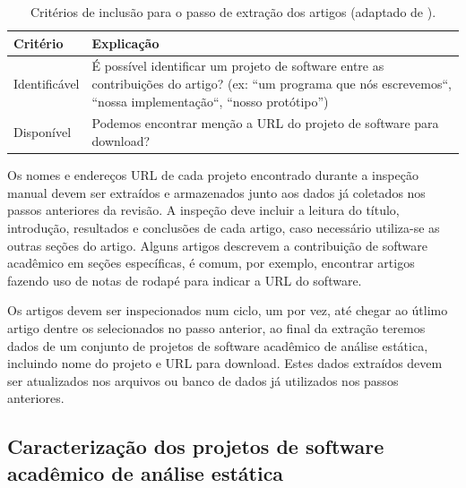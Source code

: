\begin{table}[h]
\caption{Critérios de inclusão para o passo de extração dos artigos (adaptado de ).}
\centering
\begin{tabular}{ l p{12cm} }
  \hline
  Critério         & Explicação \\
  \hline
  Identificável    & É possível identificar um projeto de software entre as contribuições do artigo? (ex: ``um programa que nós escrevemos``, ``nossa implementação``, ``nosso protótipo'') \\
  Disponível       & Podemos encontrar menção a URL do projeto de software para download? \\
  \hline
\end{tabular}
\label{criterios-extracao}
\end{table}

Os nomes e endereços URL de cada projeto encontrado durante a inspeção manual
devem ser extraídos e armazenados junto aos dados já coletados nos passos
anteriores da revisão. A inspeção deve incluir a leitura do título, introdução,
resultados e conclusões de cada artigo, caso necessário utiliza-se as outras
seções do artigo. Alguns artigos descrevem a contribuição de software acadêmico
em seções específicas, é comum, por exemplo, encontrar artigos fazendo uso de
notas de rodapé para indicar a URL do software.

Os artigos devem ser inspecionados num ciclo, um por vez, até chegar ao útlimo
artigo dentre os selecionados no passo anterior, ao final da extração teremos
dados de um conjunto de projetos de software acadêmico de análise estática,
incluindo nome do projeto e URL para download. Estes dados extraídos devem ser
atualizados nos arquivos ou banco de dados já utilizados nos passos anteriores.



\subsection{Caracterização dos projetos de software acadêmico de análise estática}

